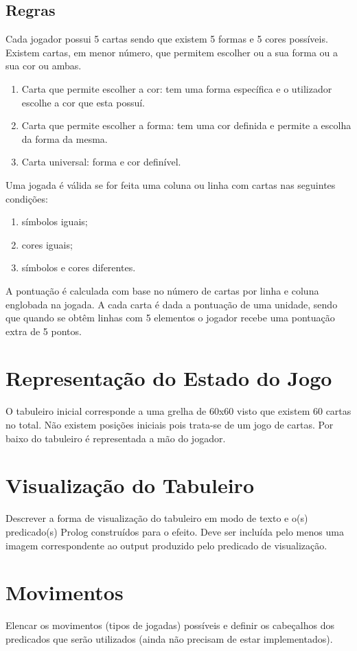 \documentclass[a4paper]{article}
\begin{document}
\subsection{Regras}

Cada jogador possui 5 cartas sendo que existem 5 formas e 5 cores possíveis. Existem cartas, em menor número, que permitem escolher ou a sua forma ou a sua cor ou ambas.

\begin{enumerate}
	\item Carta que permite escolher a cor: tem uma forma específica e o utilizador escolhe a cor que esta possuí. 
	\item Carta que permite escolher a forma: tem uma cor definida e permite a escolha da forma da mesma.
	\item Carta universal: forma e cor definível. 
\end{enumerate}

Uma jogada é válida se for feita uma coluna ou linha com cartas nas seguintes condições:

\begin{enumerate}
	\item símbolos iguais;
	\item cores iguais;
	\item símbolos e cores diferentes.
\end{enumerate}

A pontuação é calculada com base no número de cartas por linha e coluna englobada na jogada. A cada carta é dada a pontuação de uma unidade, sendo que quando se obtêm linhas com 5 elementos o jogador recebe uma pontuação extra de 5 pontos. 

\section{Representação do Estado do Jogo}

O tabuleiro inicial corresponde a uma grelha de 60x60 visto que existem 60 cartas no total. Não existem posições iniciais pois trata-se de um jogo de cartas. Por baixo do tabuleiro é representada a mão do jogador.


\section{Visualização do Tabuleiro}

Descrever a forma de visualização do tabuleiro em modo de texto e o(s) predicado(s) Prolog construídos para o efeito.
Deve ser incluída pelo menos uma imagem correspondente ao output produzido pelo predicado de visualização.


\section{Movimentos}

Elencar os movimentos (tipos de jogadas) possíveis e definir os cabeçalhos dos predicados que serão utilizados (ainda não precisam de estar implementados).
\end{document}
